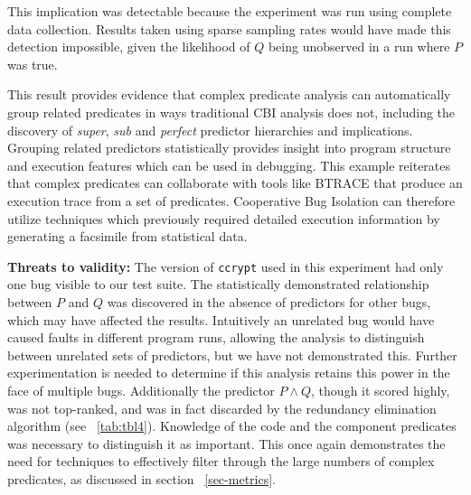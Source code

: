 This implication was detectable because the experiment was run using complete data collection.  Results taken using sparse sampling rates would have made this detection impossible, given the likelihood of $Q$ being unobserved in a run where $P$ was true.

This result provides evidence that complex predicate analysis can automatically group related predicates in ways traditional CBI analysis does not, including the discovery of \textit{super}, \textit{sub} and \textit{perfect} predictor hierarchies and implications.  Grouping related predictors statistically provides insight into program structure and execution features which can be used in debugging.  This example reiterates that complex predicates can collaborate with tools like BTRACE that produce an execution trace from a set of predicates.  Cooperative Bug Isolation can therefore utilize techniques which previously required detailed execution information by generating a facsimile from statistical data.

\vspace{4pt} \noindent
{\bf Threats to validity:}
The version of \texttt{ccrypt} used in this experiment had only one bug visible to our test suite.  The statistically demonstrated relationship between $P$ and $Q$ was discovered in the absence of predictors for other bugs, which may have affected the results.  Intuitively an unrelated bug would have caused faults in different program runs, allowing the analysis to distinguish between unrelated sets of predictors, but we have not demonstrated this.  Further experimentation is needed to determine if this analysis retains this power in the face of multiple bugs.  Additionally the predictor $P \wedge Q$, though it scored highly, was not top-ranked, and was in fact discarded by the redundancy elimination algorithm (see ~\autoref{tab:tbl4}).  Knowledge of the code and the component predicates was necessary to distinguish it as important.  This once again demonstrates the need for techniques to effectively filter through the large numbers of complex predicates, as discussed in section ~\ref{sec-metrics}.
